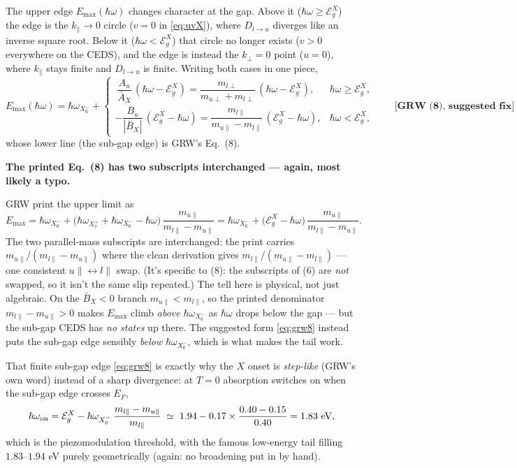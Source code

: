\documentclass[11pt,a4paper]{article}
\newenvironment{printfix}[1]{%
  \begin{mdframed}[style=printfixstyle]%
  \noindent\textbf{\textcolor{BrickRed}{#1}}\par\smallskip\noindent\ignorespaces}%
  {\end{mdframed}}
\numberwithin{equation}{section}
\newcommand{\hw}{\hbar\omega}
\newcommand{\EgX}{\mathcal{E}_g^{X}}
\newcommand{\AX}{\bar{A}_X}
\newcommand{\BX}{\bar{B}_X}
\newcommand{\kperp}{k_{\perp}}
\newcommand{\kpar}{k_{\parallel}}
\newcommand{\wXsix}{\hbar\omega_{X_6^-}}
\newcommand{\wXseven}{\hbar\omega_{X_7^+}}
\newcommand{\grwfix}[1]{\textbf{[GRW~(#1), suggested fix]}}
\begin{document}
The upper edge $E_{\max}(\hw)$ changes character at the gap. Above it
($\hw\ge\EgX$) the edge is the $\kpar\to0$ circle ($v=0$ in
\eqref{eq:uvX}), where $D_{l\to u}$ diverges like an inverse square
root. Below it ($\hw<\EgX$) that circle no longer exists ($v>0$
everywhere on the CEDS), and the edge is instead the $\kperp=0$ point
($u=0$), where $\kpar$ stays finite and $D_{l\to u}$ is finite. Writing
both cases in one piece,
\begin{equation}
E_{\max}(\hw)=\wXsix+
\begin{cases}
\ \dfrac{A_u}{\AX}\,(\hw-\EgX)
=\dfrac{m_{l\perp}}{m_{u\perp}+m_{l\perp}}\,(\hw-\EgX),
& \hw\ge\EgX,\\[12pt]
-\dfrac{B_u}{|\BX|}\,(\EgX-\hw)
=\dfrac{m_{l\parallel}}{m_{u\parallel}-m_{l\parallel}}\,(\EgX-\hw),
& \hw<\EgX,
\end{cases}
\qquad\grwfix{8}
\label{eq:grw8}
\end{equation}
whose lower line (the sub-gap edge) is GRW's Eq.~(8).

\begin{printfix}{The printed Eq.~(8) has two subscripts interchanged
--- again, most likely a typo.}
GRW print the upper limit as
\begin{equation*}
E_{\max}=\wXsix+\bigl(\wXseven+\wXsix-\hw\bigr)\,
\frac{m_{u\parallel}}{m_{l\parallel}-m_{u\parallel}}
=\wXsix+\bigl(\EgX-\hw\bigr)\,
\frac{m_{u\parallel}}{m_{l\parallel}-m_{u\parallel}}. \tag{8, as printed}
\end{equation*}
The two parallel-mass subscripts are interchanged: the print carries
$m_{u\parallel}/(m_{l\parallel}-m_{u\parallel})$ where the clean
derivation gives $m_{l\parallel}/(m_{u\parallel}-m_{l\parallel})$ ---
one consistent $u\!\parallel\!\leftrightarrow\!l\!\parallel$ swap.
(It's specific to (8): the subscripts of (6) are \emph{not} swapped,
so it isn't the same slip repeated.) The tell here is physical, not
just algebraic. On the $\BX<0$ branch $m_{u\parallel}<m_{l\parallel}$,
so the printed denominator $m_{l\parallel}-m_{u\parallel}>0$ makes
$E_{\max}$ climb \emph{above} $\wXsix$ as $\hw$ drops below the gap ---
but the sub-gap CEDS has \emph{no states} up there. The suggested form
\eqref{eq:grw8} instead puts the sub-gap edge sensibly \emph{below}
$\wXsix$, which is what makes the tail work.
\end{printfix}

That finite sub-gap edge \eqref{eq:grw8} is exactly why the $X$ onset
is \emph{step-like} (GRW's own word) instead of a sharp divergence: at
$T=0$ absorption switches on when the sub-gap edge crosses $E_F$,
\begin{equation}
\hw_{\rm on}
=\EgX-\wXsix\,\frac{m_{l\parallel}-m_{u\parallel}}{m_{l\parallel}}
\;\simeq\;1.94-0.17\times\frac{0.40-0.15}{0.40}
=1.83\ \text{eV},
\label{eq:onset}
\end{equation}
which is the piezomodulation threshold, with the famous low-energy
tail filling $1.83$--$1.94$ eV purely geometrically (again: no
broadening put in by hand).
\end{document}
